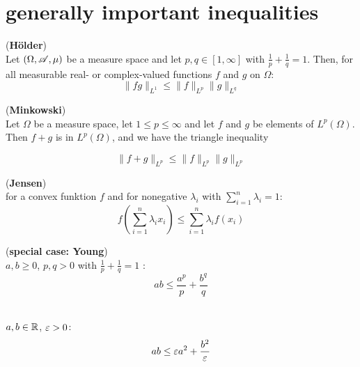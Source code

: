 \section{generally important inequalities}

\begin{theorem}(\textbf{H\"older})\\
	Let $(\Omega, \mathscr{A}, \mu)$ be a measure space and let $p, q \in [1, \infty]$ with $\frac{1}{p} + \frac{1}{q} = 1$. Then, for all measurable real- or complex-valued functions $f$ and $g$ on $\Omega$:
	\begin{equation*}
		\|fg\|_{L^1} \leq \|f\|_{L^p} \|g\|_{L^q}
	\end{equation*}
\end{theorem}


\begin{theorem}(\textbf{Minkowski})\\
	 Let $\Omega$ be a measure space, let $1 \leq p \leq \infty$ and let $f$ and $g$ be elements of $L^p(\Omega)$. Then $f + g$ is in $L^p(\Omega)$, and we have the triangle inequality

	\begin{equation*}
	\|f+g\|_{L^p} \leq \|f\|_{L^p} \|g\|_{L^p}
	\end{equation*}
\end{theorem}


\begin{theorem}(\textbf{Jensen})\\
	for a convex funktion $f$ and for nonegative $\lambda_i$ with $\sum_{i = 1}^n \lambda_i = 1$: 
	\begin{equation*}
	f \left( \displaystyle \sum_{i=1}^{n} \lambda_i x_i \right) \leq \displaystyle \sum_{i=1}^{n} \lambda_i f(x_i)
	\end{equation*}
\end{theorem}

\begin{theorem}(\textbf{special case: Young})\\
	$a,b \geq 0$, $p,q > 0$ with $\frac{1}{p} + \frac{1}{q} = 1$ :
	\begin{equation*}
	ab \leq \frac{a^p}{p} + \frac{b^q}{q}
	\end{equation*}
\end{theorem}

\begin{theorem}\ \\
	$a,b \in \mathbb{R}$, $\varepsilon > 0$:
	\begin{equation*}
	ab \leq \varepsilon a^2 + \frac{b^2}{\varepsilon}
	\end{equation*}
\end{theorem}
